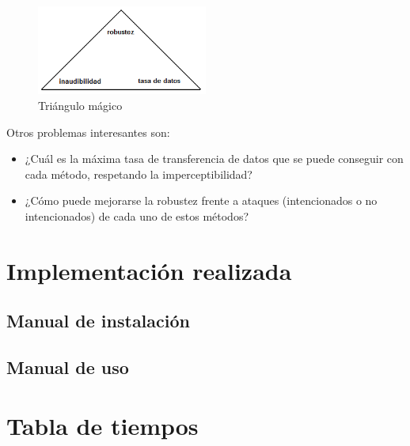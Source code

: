 \documentclass[12pt]{article}
\begin{document}
\begin{figure}[h]
  \centering
    \includegraphics[width=0.5\textwidth]{img/magictriangle}
  \caption{Triángulo mágico}
  \label{magictriangle}
\end{figure}

Otros problemas interesantes son:

\begin{itemize}

\item ¿Cuál es la máxima tasa de transferencia de datos que se puede conseguir con cada método, respetando la imperceptibilidad?

\item ¿Cómo puede mejorarse la robustez frente a ataques (intencionados o no intencionados) de cada uno de estos métodos?

\end{itemize}

\newpage
\section{Implementación realizada}

\subsection{Manual de instalación}

\subsection{Manual de uso}

\newpage
\section{Tabla de tiempos}
\end{document}

